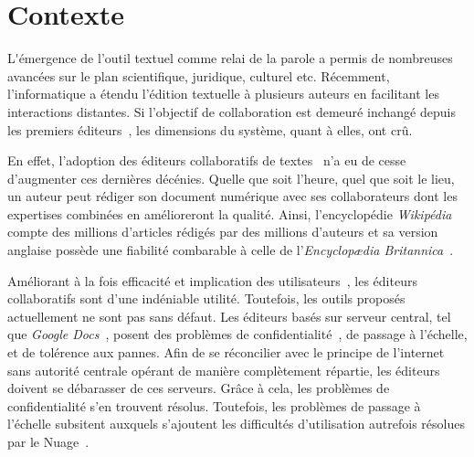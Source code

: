 
\section{Contexte}

\lettrine{L}'émergence de l'outil textuel comme relai de la parole a permis de
nombreuses avancées sur le plan scientifique, juridique, culturel
etc. Récemment, l'informatique a étendu l'édition textuelle à plusieurs auteurs
en facilitant les interactions distantes. Si l'objectif de collaboration est
demeuré inchangé depuis les premiers éditeurs~\cite{engelbart1968research}, les
dimensions du système, quant à elles, ont crû.

En effet, l'adoption des éditeurs collaboratifs de
textes~\cite{ellis1991groupware} n'a eu de cesse d'augmenter ces dernières
décénies.
Quelle que soit l'heure, quel que soit le lieu, un auteur peut rédiger son
document numérique avec ses collaborateurs dont les expertises combinées en
amélioreront la qualité. Ainsi, l'encyclopédie \emph{Wikipédia} compte des
millions d'articles rédigés par des millions d'auteurs et sa version anglaise
possède une fiabilité combarable à celle de l'\emph{Encyclopædia
  Britannica}~\cite{giles2005internet}.

Améliorant à la fois efficacité et implication des
utilisateurs~\cite{noel2004empirical}, les éditeurs collaboratifs sont d'une
indéniable utilité. Toutefois, les outils proposés actuellement ne sont pas sans
défaut. Les éditeurs basés sur serveur central, tel que \emph{Google
  Docs}~\cite{googledocs}, posent des problèmes de
confidentialité~\cite{gellman2013us}, de passage à l'échelle, et de tolérence
aux pannes.
Afin de se réconcilier avec le principe de l'internet sans autorité centrale
opérant de manière complètement répartie, les éditeurs doivent se débarasser de
ces serveurs. Grâce à cela, les problèmes de confidentialité s'en trouvent
résolus. Toutefois, les problèmes de passage à l'échelle subsitent auxquels
s'ajoutent les difficultés d'utilisation autrefois résolues par le
Nuage~\cite{mell2011national}.


